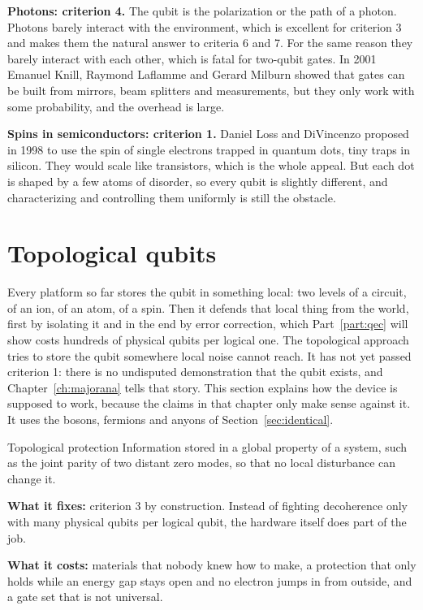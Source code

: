 \textbf{Photons: criterion 4.} The qubit is the polarization or the path of a photon. Photons
barely interact with the environment, which is excellent for criterion 3 and makes them the
natural answer to criteria 6 and 7. For the same reason they barely interact with each other,
which is fatal for two-qubit gates. In 2001 Emanuel Knill, Raymond Laflamme and Gerard Milburn
showed that gates can be built from mirrors, beam splitters and measurements, but they only work
with some probability, and the overhead is large.

\textbf{Spins in semiconductors: criterion 1.} Daniel Loss and DiVincenzo proposed in 1998 to use
the spin of single electrons trapped in quantum dots, tiny traps in silicon. They would scale like
transistors, which is the whole appeal. But each dot is shaped by a few atoms of disorder, so every
qubit is slightly different, and characterizing and controlling them uniformly is still the
obstacle.

\section{Topological qubits}\label{sec:topological}

Every platform so far stores the qubit in something local: two levels of a circuit, of an ion,
of an atom, of a spin. Then it defends that local thing from the world, first by isolating it
and in the end by error correction, which Part~\ref{part:qec} will show costs hundreds of
physical qubits per logical one. The topological approach tries to store the qubit somewhere
local noise cannot reach. It has not yet passed criterion 1: there is no undisputed
demonstration that the qubit exists, and Chapter~\ref{ch:majorana} tells that story. This
section explains how the device is supposed to work, because the claims in that chapter only
make sense against it. It uses the bosons, fermions and anyons of Section~\ref{sec:identical}.

\begin{concept}{Topological protection}
Information stored in a global property of a system, such as the joint parity of two
distant zero modes, so that no local disturbance can change it.

\textbf{What it fixes:} criterion 3 by construction. Instead of fighting decoherence only
with many physical qubits per logical qubit, the hardware itself does part of the job.

\textbf{What it costs:} materials that nobody knew how to make, a protection that only
holds while an energy gap stays open and no electron jumps in from outside, and a gate set
that is not universal.
\end{concept}

